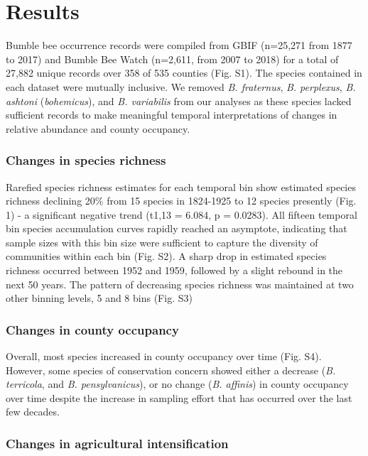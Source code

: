 \documentclass[11pt,]{article}
\begin{document}
\hypertarget{results}{%
\section{Results}\label{results}}

Bumble bee occurrence records were compiled from GBIF (n=25,271 from
1877 to 2017) and Bumble Bee Watch (n=2,611, from 2007 to 2018) for a
total of 27,882 unique records over 358 of 535 counties (Fig. S1). The
species contained in each dataset were mutually inclusive. We removed
\emph{B. fraternus}, \emph{B. perplexus}, \emph{B. ashtoni}
(\emph{bohemicus}), and \emph{B. variabilis} from our analyses as these
species lacked sufficient records to make meaningful temporal
interpretations of changes in relative abundance and county occupancy.

\hypertarget{changes-in-species-richness}{%
\subsubsection{Changes in species
richness}\label{changes-in-species-richness}}

Rarefied species richness estimates for each temporal bin show estimated
species richness declining 20\% from 15 species in 1824-1925 to 12
species presently (Fig. 1) - a significant negative trend (t1,13 =
6.084, p = 0.0283). All fifteen temporal bin species accumulation curves
rapidly reached an asymptote, indicating that sample sizes with this bin
size were sufficient to capture the diversity of communities within each
bin (Fig. S2). A sharp drop in estimated species richness occurred
between 1952 and 1959, followed by a slight rebound in the next 50
years. The pattern of decreasing species richness was maintained at two
other binning levels, 5 and 8 bins (Fig. S3)

\hypertarget{changes-in-county-occupancy}{%
\subsubsection{Changes in county
occupancy}\label{changes-in-county-occupancy}}

Overall, most species increased in county occupancy over time (Fig. S4).
However, some species of conservation concern showed either a decrease
(\emph{B. terricola}, and \emph{B. pensylvanicus}), or no change
(\emph{B. affinis}) in county occupancy over time despite the increase
in sampling effort that has occurred over the last few decades.

\hypertarget{changes-in-agricultural-intensification}{%
\subsubsection{Changes in agricultural
intensification}\label{changes-in-agricultural-intensification}}
\end{document}

